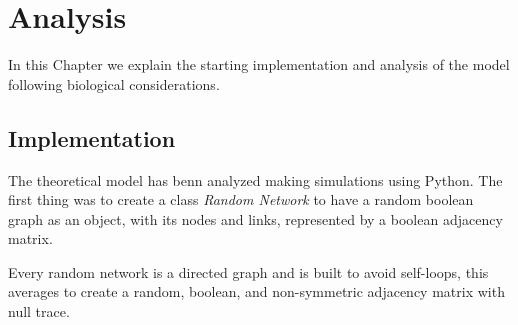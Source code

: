 \chapter{Analysis}\label{analysis}
\lhead[\fancyplain{}{\bfseries\thepage}]{\fancyplain{}{\bfseries\rightmark}}

In this Chapter we explain the starting implementation and analysis of the model following biological considerations.

\section{Implementation}

The theoretical model has benn analyzed making simulations using Python.
The first thing was to create a class \emph{Random Network} to have a random boolean graph as an object, with its nodes and links, represented by a boolean adjacency matrix.

Every random network is a directed graph and is built to avoid self-loops, this averages to create a random, boolean, and non-symmetric adjacency matrix with null trace.

